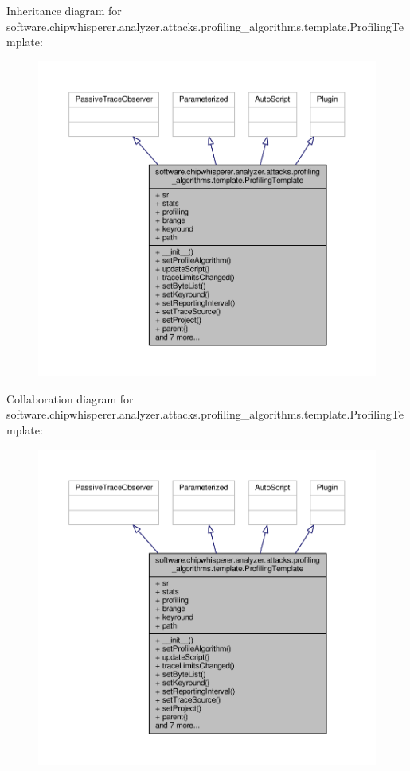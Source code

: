 Inheritance diagram for software.\+chipwhisperer.\+analyzer.\+attacks.\+profiling\+\_\+algorithms.\+template.\+Profiling\+Template\+:\nopagebreak
\begin{figure}[H]
\begin{center}
\leavevmode
\includegraphics[width=350pt]{df/db6/classsoftware_1_1chipwhisperer_1_1analyzer_1_1attacks_1_1profiling__algorithms_1_1template_1_1ProfilingTemplate__inherit__graph}
\end{center}
\end{figure}


Collaboration diagram for software.\+chipwhisperer.\+analyzer.\+attacks.\+profiling\+\_\+algorithms.\+template.\+Profiling\+Template\+:\nopagebreak
\begin{figure}[H]
\begin{center}
\leavevmode
\includegraphics[width=350pt]{df/dc1/classsoftware_1_1chipwhisperer_1_1analyzer_1_1attacks_1_1profiling__algorithms_1_1template_1_1ProfilingTemplate__coll__graph}
\end{center}
\end{figure}


